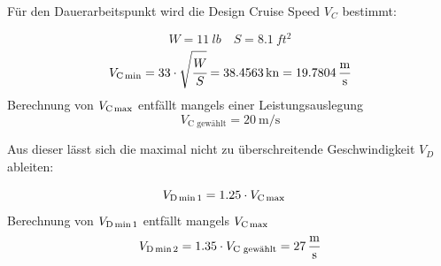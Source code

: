 
\clearpage

Für den Dauerarbeitspunkt wird die Design Cruise Speed $V_{C}$ bestimmt:

\begin{equation}
\label{eq:K8}
W=\SI{11}{lb} \quad S=\SI{8,1}{ft^2}
\end{equation}
\begin{equation}
\label{eq:K8}
V_{\text{C\,min}}=33 \cdot \sqrt{\cfrac{W}{S}}=\SI{38,4563}{kn}=\SI[per-mode = fraction]{19,7804}{\meter\per\second}
\end{equation}
Berechnung von $V_{\text{C\,max}}$ entfällt mangels einer Leistungsauslegung
\begin{equation}
\label{eq:K8}
V_{\text{C\ gewählt}}=\SI[per-mode = fraction]{20}{\meter\per\second} 
\end{equation}


Aus dieser lässt sich die maximal nicht zu überschreitende Geschwindigkeit $V_{D}$ ableiten:

\begin{equation}
\label{eq:K8}
V_{\text{D\,min\,1}}=1.25 \cdot V_{\text{C\,max}} \quad 
\end{equation}
Berechnung von $V_{\text{D\,min\,1}}$ entfällt mangels $V_{\text{C\,max}}$
\begin{equation}
\label{eq:K8}
V_{\text{D\,min\,2}}=1.35 \cdot V_{\text{C\ gewählt}}=\SI[per-mode = fraction]{27}{\meter\per\second} 
\end{equation}



